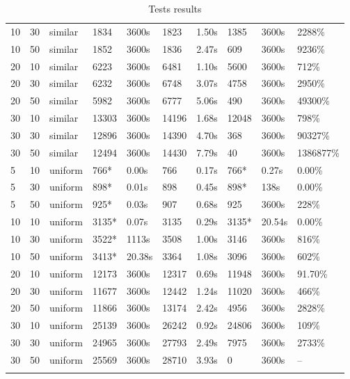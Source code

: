 \begin{scriptsize}
\begin{longtable}{@{\extracolsep{\fill}}l|l|l|ll|ll|lll@{}}
 10 & 30 & similar& 1834& 3600s& 1823& 1.50s & 1385& 3600s& 2288\% \\
 10 & 50 & similar& 1852& 3600s& 1836& 2.47s & 609& 3600s& 9236\% \\
 20 & 10 & similar& 6223& 3600s& 6481& 1.10s & 5600& 3600s& 712\% \\
 20 & 30 & similar& 6232& 3600s& 6748& 3.07s & 4758& 3600s& 2950\% \\
 20 & 50 & similar& 5982& 3600s& 6777& 5.06s & 490& 3600s& 49300\% \\
 30 & 10 & similar& 13303& 3600s& 14196& 1.68s & 12048& 3600s& 798\% \\
 30 & 30 & similar& 12896& 3600s& 14390& 4.70s & 368& 3600s& 90327\% \\
 30 & 50 & similar& 12494& 3600s& 14430& 7.79s & 40& 3600s& 1386877\% \\
 5 & 10 & uniform& 766*& 0.00s& 766& 0.17s & 766*& 0.27s & 0.00\% \\
 5 & 30 & uniform& 898*& 0.01s& 898& 0.45s & 898*& 138s & 0.00\% \\
 5 & 50 & uniform& 925*& 0.03s& 907& 0.68s & 925& 3600s& 228\% \\
 10 & 10 & uniform& 3135*& 0.07s& 3135& 0.29s & 3135*& 20.54s & 0.00\% \\
 10 & 30 & uniform& 3522*& 1113s & 3508& 1.00s & 3146& 3600s& 816\% \\
 10 & 50 & uniform& 3413*& 20.38s& 3364& 1.08s & 3096& 3600s& 602\% \\
 20 & 10 & uniform& 12173& 3600s& 12317& 0.69s & 11948& 3600s& 91.70\% \\
 20 & 30 & uniform& 11677& 3600s& 12442& 1.24s & 11020& 3600s& 466\% \\
 20 & 50 & uniform& 11866& 3600s& 13174& 2.42s & 4956& 3600s& 2828\% \\
 30 & 10 & uniform& 25139& 3600s& 26242& 0.92s & 24806& 3600s& 109\% \\
 30 & 30 & uniform& 24965& 3600s& 27793& 2.49s & 7975& 3600s& 2733\% \\
 30 & 50 & uniform& 25569& 3600s& 28710& 3.93s & 0& 3600s& -- \\
\hline 
\caption{Tests results}\\ 
\end{longtable}
\end{scriptsize}
